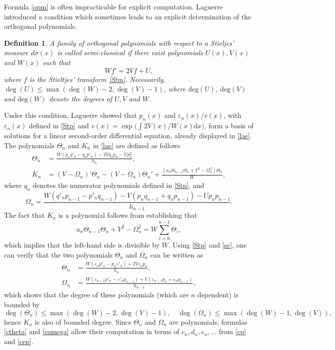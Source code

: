 \documentclass[10pt, reqno]{amsart}
\numberwithin{equation}{section}
\newtheorem{definition}{Definition}[section]
\numberwithin{equation}{section}
\begin{document}
Formula \eqref{opm} is often impracticable for explicit computation. Laguerre \cite{La} introduced a condition which sometimes leads to an explicit determination of the orthogonal polynomials.
\begin{definition} \label{definition 1.2} 
\emph{A family of orthogonal polynomials with respect to a Stieljes' measure $d\sigma(x)$ is called \emph{semi-classical} if there exist polynomials $U(x),V(x)$ and $W(x)$ such that
\begin{equation}
Wf'=2Vf+U, \label{sc}
\end{equation}
where $f$ is the Stieltjes' transform \eqref{Stm}. Necessarily, $\deg (U)\leq \max (\deg(W)-2,\deg(V)-1)$, where $\mbox{deg}(U)$, $\mbox{deg}(V)$ and $\mbox{deg} (W)$ denote the degrees of $U,V$ and $W$.}
\end{definition}
Under this condition, Laguerre \cite{La} showed that $p_n(x)$ and $\varepsilon_n(x)/v(x)$, with $\varepsilon_n(x)$ defined in \eqref{Stp} and $v(x)=\exp\big(\int 2V(x)/W(x)\mbox{d}x\big)$, form a basis of solutions for a linear second-order differential equation, already displayed in \eqref{lae}. The polynomials $\Theta_n$ and $K_n$ in \eqref{lae} are defined as follows
\begin{align}
\Theta_n&=\frac{W(p_nq'_n-q_np'_n)-2Vq_np_n-Up_n^2}{h_n}, \label{theta}\\
K_n&=(V-\Omega_n)'\Theta_n-(V-\Omega_n)\Theta_n'+\frac{(a_n\Theta_{n-1}\Theta_n+V^2-\Omega_n^2)\Theta_n}{W}, \label{K}
\end{align}
where $q_n$ denotes the numerator polynomials defined in \eqref{Stp}, and 
\begin{equation}
\Omega_n=\frac{W(q'_np_{n-1}-p'_nq_{n-1})-V(p_nq_{n-1}+q_np_{n-1})-Up_n p_{n-1}}{h_{n-1}}.\label{omega}
\end{equation}
The fact that $K_n$ is a polynomial follows from establishing that
\begin{equation}
a_n\Theta_{n-1}\Theta_n+V^2-\Omega_n^2=W\sum_{i=0}^{n-1} \Theta_i,\label{Kdiv}
\end{equation}
which implies that the left-hand side is divisible by $W$.  Using \eqref{Stp} and \eqref{sc}, one can verify that the two polynomials $\Theta_n$ and $\Omega_n$ can be written as 
\begin{align}
\Theta_n&=\frac{W(\varepsilon_n p'_n-p_n \varepsilon'_n)+2V\varepsilon_n p_n}{h_n},\label{ctheta}\\
\Omega_n&=\frac{W(\varepsilon_{n-1}p'_n-\varepsilon'_np_{n-1})+V(\varepsilon_{n-1}p_n+\varepsilon_np_{n-1})}{h_{n-1}},\label{comega}
\end{align}
which shows that the degree of these polynomials (which are $n$ dependent) is bounded by
\begin{equation*}
\deg(\Theta_n)\leq \max(\deg (W)-2,\deg(V)-1),\quad \deg(\Omega_n)\leq \max (\deg(W)-1, \deg(V)),
\end{equation*}
hence $K_n$ is also of bounded degree. Since $\Theta_n$ and $\Omega_n$ are polynomials, formulas \eqref{ctheta} and \eqref{comega} allow their computation in terms of $c_n, d_n, e_n, ...$ from \eqref{cp} and \eqref{cep}.
\end{document}
